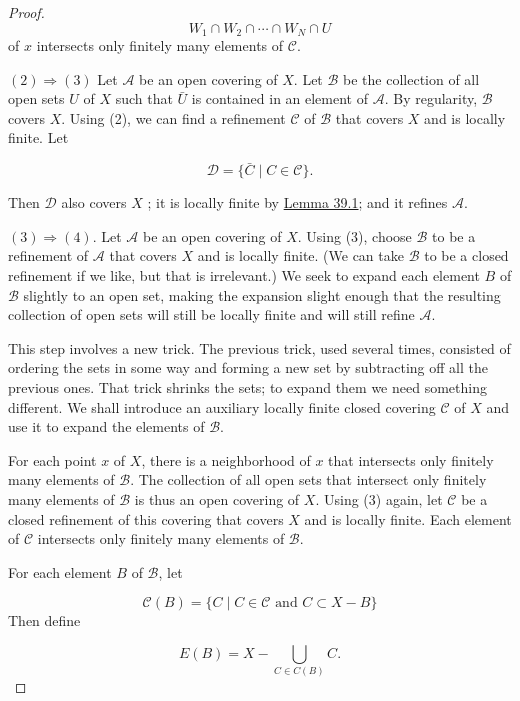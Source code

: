 \begin{proof}
\[
W_{1} \cap {W}_{2} \cap \cdots \cap {W}_{N} \cap U
\]
of \(x\) intersects only finitely many elements of \(\mathcal{C}\).

\((2) \Rightarrow (3)\) Let \(\mathcal{A}\) be an open covering of \(X\). Let \(\mathcal{B}\) be the collection of all open sets \(U\) of \(X\) such that \(\bar{U}\) is contained in an element of \(\mathcal{A}\). By regularity, \(\mathcal{B}\) covers \(X\). Using (2), we can find a refinement \(\mathcal{C}\) of \(\mathcal{B}\) that covers \(X\) and is locally finite. Let

\[
\mathcal{D} = \{ \bar{C} \mid C \in \mathcal{C}\}.
\]

Then \(\mathcal{D}\) also covers \(X\) ; it is locally finite by \hyperref[lem:39.1]{Lemma 39.1}; and it refines \(\mathcal{A}\).

\((3) \Rightarrow (4)\). Let \(\mathcal{A}\) be an open covering of \(X\). Using (3), choose \(\mathcal{B}\) to be a refinement of \(\mathcal{A}\) that covers \(X\) and is locally finite. (We can take \(\mathcal{B}\) to be a closed refinement if we like, but that is irrelevant.) We seek to expand each element \(B\) of \(\mathcal{B}\) slightly to an open set, making the expansion slight enough that the resulting collection of open sets will still be locally finite and will still refine \(\mathcal{A}\).

This step involves a new trick. The previous trick, used several times, consisted of ordering the sets in some way and forming a new set by subtracting off all the previous ones. That trick shrinks the sets; to expand them we need something different. We shall introduce an auxiliary locally finite closed covering \(\mathcal{C}\) of \(X\) and use it to expand the elements of \(\mathcal{B}\).

For each point \(x\) of \(X\), there is a neighborhood of \(x\) that intersects only finitely many elements of \(\mathcal{B}\). The collection of all open sets that intersect only finitely many elements of \(\mathcal{B}\) is thus an open covering of \(X\). Using (3) again, let \(\mathcal{C}\) be a closed refinement of this covering that covers \(X\) and is locally finite. Each element of \(\mathcal{C}\) intersects only finitely many elements of \(\mathcal{B}\).

For each element \(B\) of \(\mathcal{B}\), let

\[
\mathcal{C}(B) = \{ C \mid C \in \mathcal{C}\text{ and }C \subset X - B\}
\]
Then define

\[
E(B) = X - \mathop{\bigcup }\limits_{{C \in C(B) }}C.
\]


\end{proof}
